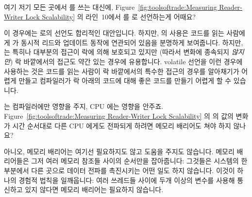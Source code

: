 \begin{enumerate}

\QuickQ{}
	여기 저기 모든 곳에서  를 쓰는 대신에,
	Figure~\ref{fig:toolsoftrade:Measuring Reader-Writer Lock Scalability}
	의 라인~10에서  를  로 선언하는게 어때요?

\QuickA{}
	이 경우에는  로의 선언도 합리적인 대안입니다.
	하지만,  의 사용은 코드를 읽는 사람에게 
	가 동시적 리드와 업데이트 동작에 연관되어 있음을 분명하게 보여줍니다.
	하지만,  는 특히나 대부분의 접근이 락에 의해 보호되고
	있지만 (따라서 변화에 종속되지 \emph{않지만}) 락 바깥에서의 접근도 약간
	있는 경우에 유용합니다.
	volatile 선언을 이런 경우에 사용하는 것은 코드를 읽는 사람이 락
	바깥에서의 특수한 접근의 경우를 알아채기가 어렵게 만들고 컴파일러가 락
	아래의 코드에 대해 좋은 코드를 만들기 어렵게 할 수 있습니다.

\QuickQ{}
	 는 컴파일러에만 영향을 주지, CPU 에는 영향을 안주죠.
	Figure~\ref{fig:toolsoftrade:Measuring Reader-Writer Lock Scalability}
	의  의 값의 변화가 시간 순서대로 다른 CPU 에게도 전파되게
	하려면 메모리 배리어도 쳐야 하지 않나요?

\QuickA{}
	아니오, 메모리 배리어는 여기선 필요하지도 않고 도움을 주지도 않습니다.
	메모리 배리어들은 그저 여러 메모리 참조들 사이의 순서만을 잡아줍니다:
	그것들은 시스템의 한 부분에서 다른 곳으로 데이터 전파를 촉진시키는 어떤
	일도 하지 않습니다.
	이것이 하나의 경험적 법칙을 일깨웁니다:  여러 쓰레드들 사이에 두개
	이상의 변수를 사용해 통신하고 있지 않다면 메모리 배리어는 필요하지
	않습니다.


\end{enumerate}
